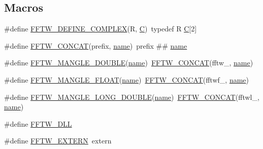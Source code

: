\subsection*{Macros}
\begin{DoxyCompactItemize}
\item 
\#define \hyperlink{fftw-3_82_82-dll64_2fftw3_8h_ad8f7c74106f1f4e6e9e440939ed0c3e5}{F\-F\-T\-W\-\_\-\-D\-E\-F\-I\-N\-E\-\_\-\-C\-O\-M\-P\-L\-E\-X}(R, \hyperlink{fileio__fftw3_8cpp_ac4cf4b2ab929bd23951a8676eeac086b}{C})~typedef R \hyperlink{fileio__fftw3_8cpp_ac4cf4b2ab929bd23951a8676eeac086b}{C}\mbox{[}2\mbox{]}
\item 
\#define \hyperlink{fftw-3_82_82-dll64_2fftw3_8h_a8c2d0a5b182d76f85ba5d2ca10d0d14e}{F\-F\-T\-W\-\_\-\-C\-O\-N\-C\-A\-T}(prefix, \hyperlink{qmb_8m_abdc1dcc6fed70c14f9b5ae237e486f4e}{name})~prefix \#\# \hyperlink{qmb_8m_abdc1dcc6fed70c14f9b5ae237e486f4e}{name}
\item 
\#define \hyperlink{fftw-3_82_82-dll64_2fftw3_8h_a9a34b98e69e15389db5f159526aca09a}{F\-F\-T\-W\-\_\-\-M\-A\-N\-G\-L\-E\-\_\-\-D\-O\-U\-B\-L\-E}(\hyperlink{qmb_8m_abdc1dcc6fed70c14f9b5ae237e486f4e}{name})~\hyperlink{_g_u_i___matlab_2fftw3_8h_a8c2d0a5b182d76f85ba5d2ca10d0d14e}{F\-F\-T\-W\-\_\-\-C\-O\-N\-C\-A\-T}(fftw\-\_\-, \hyperlink{qmb_8m_abdc1dcc6fed70c14f9b5ae237e486f4e}{name})
\item 
\#define \hyperlink{fftw-3_82_82-dll64_2fftw3_8h_a0ff9d4e79eb81c3c32f9683c019841b7}{F\-F\-T\-W\-\_\-\-M\-A\-N\-G\-L\-E\-\_\-\-F\-L\-O\-A\-T}(\hyperlink{qmb_8m_abdc1dcc6fed70c14f9b5ae237e486f4e}{name})~\hyperlink{_g_u_i___matlab_2fftw3_8h_a8c2d0a5b182d76f85ba5d2ca10d0d14e}{F\-F\-T\-W\-\_\-\-C\-O\-N\-C\-A\-T}(fftwf\-\_\-, \hyperlink{qmb_8m_abdc1dcc6fed70c14f9b5ae237e486f4e}{name})
\item 
\#define \hyperlink{fftw-3_82_82-dll64_2fftw3_8h_a773f224bb53aff99ad9a07e10cdbf1c2}{F\-F\-T\-W\-\_\-\-M\-A\-N\-G\-L\-E\-\_\-\-L\-O\-N\-G\-\_\-\-D\-O\-U\-B\-L\-E}(\hyperlink{qmb_8m_abdc1dcc6fed70c14f9b5ae237e486f4e}{name})~\hyperlink{_g_u_i___matlab_2fftw3_8h_a8c2d0a5b182d76f85ba5d2ca10d0d14e}{F\-F\-T\-W\-\_\-\-C\-O\-N\-C\-A\-T}(fftwl\-\_\-, \hyperlink{qmb_8m_abdc1dcc6fed70c14f9b5ae237e486f4e}{name})
\item 
\#define \hyperlink{fftw-3_82_82-dll64_2fftw3_8h_a0e8309b7b6d200db75e0eb74cb0033e1}{F\-F\-T\-W\-\_\-\-D\-L\-L}
\item 
\#define \hyperlink{fftw-3_82_82-dll64_2fftw3_8h_a92cf927d928046b75d77824d34e9b084}{F\-F\-T\-W\-\_\-\-E\-X\-T\-E\-R\-N}~extern
\item 

\end{DoxyCompactItemize}
